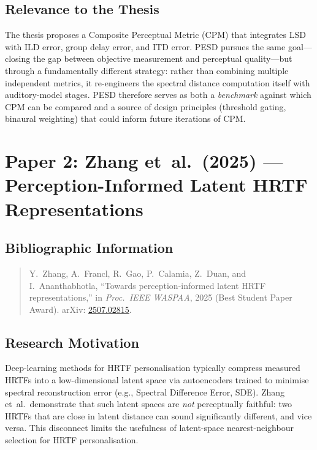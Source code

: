\documentclass[12pt,a4paper]{article}
\begin{document}
\subsection{Relevance to the Thesis}

The thesis proposes a Composite Perceptual Metric (CPM) that integrates
LSD with ILD error, group delay error, and ITD error.  PESD pursues the
same goal---closing the gap between objective measurement and perceptual
quality---but through a fundamentally different strategy: rather than
combining multiple independent metrics, it re-engineers the spectral
distance computation itself with auditory-model stages.  PESD therefore
serves as both a \emph{benchmark} against which CPM can be compared and a
source of design principles (threshold gating, binaural weighting) that
could inform future iterations of CPM.


\newpage
\section{Paper 2: Zhang et~al.\ (2025) --- Perception-Informed Latent
         HRTF Representations}

\subsection{Bibliographic Information}

\begin{quote}
Y.~Zhang, A.~Francl, R.~Gao, P.~Calamia, Z.~Duan, and
I.~Ananthabhotla,
``Towards perception-informed latent HRTF representations,''
in \textit{Proc.\ IEEE WASPAA}, 2025 (Best Student Paper Award).
arXiv: \href{https://arxiv.org/abs/2507.02815}{2507.02815}.
\end{quote}

\subsection{Research Motivation}

Deep-learning methods for HRTF personalisation typically compress measured
HRTFs into a low-dimensional latent space via autoencoders trained to
minimise spectral reconstruction error (e.g., Spectral Difference
Error, SDE).  Zhang et~al.\ demonstrate that such latent spaces are
\emph{not} perceptually faithful: two HRTFs that are close in latent
distance can sound significantly different, and vice versa.  This
disconnect limits the usefulness of latent-space nearest-neighbour
selection for HRTF personalisation.
\end{document}
